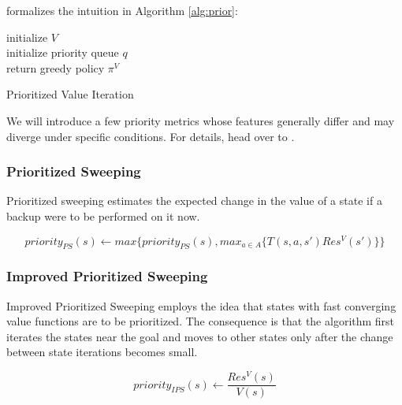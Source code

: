 \cite{Kolobov2012} formalizes the intuition in Algorithm \ref{alg:prior}:

\LinesNumbered
\begin{algorithm}[!ht]
\SetAlgoLined
initialize $V$ \\
initialize priority queue $q$ \\
return greedy policy $\pi^{V}$
\caption{Prioritized Value Iteration}
\label{alg:prior}
\end{algorithm}

We will introduce a few priority metrics whose features generally differ and may diverge under specific conditions. For details, head over to \cite{Kolobov2012}.


\subsubsection{Prioritized Sweeping} 

Prioritized sweeping estimates the expected change in the value of a state if a backup were to be performed on it now.

\nopagebreak

\begin{equation}priority_{PS} (s) \xleftarrow{} max \Big\{ priority_{PS} (s), max_{a \in A} \big\{ T(s, a, s') Res^{V}(s')\big\} \Big\} \end{equation}


\subsubsection{Improved Prioritized Sweeping}

Improved Prioritized Sweeping employs the idea that states with fast converging value functions are to be prioritized. The consequence is that the algorithm first iterates the states near the goal and moves to other states only after the change between state iterations becomes small.

\nopagebreak

\begin{equation}priority_{IPS} (s) \xleftarrow{} \frac{Res^{V} (s)}{V (s)} \end{equation}

